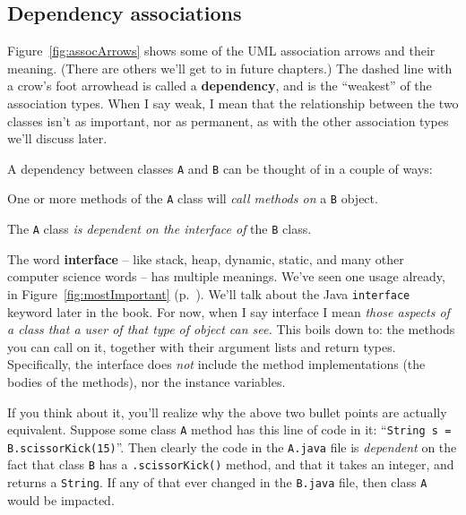 \subsection{Dependency associations}

Figure~\ref{fig:assocArrows} shows some of the UML association arrows and
their meaning. (There are others we'll get to in future chapters.) The dashed
line with a crow's foot arrowhead is called a \textbf{dependency}, and is the
``weakest'' of the association types. When I say weak, I mean that the
relationship between the two classes isn't as important, nor as permanent, as
with the other association types we'll discuss later.

A dependency between classes \texttt{A} and \texttt{B} can be thought of in a
couple of ways:

\begin{compactitem}
\item One or more methods of the \texttt{A} class will \textit{call methods
on} a \texttt{B} object.
\item The \texttt{A} class \textit{is dependent on the interface of} the
\texttt{B} class.
\end{compactitem}


The word \textbf{interface} -- like stack, heap, dynamic, static, and many
other computer science words -- has multiple meanings. We've seen one usage
already, in Figure~\ref{fig:mostImportant} (p.~\pageref{fig:mostImportant}).
We'll talk about the Java \texttt{interface} keyword later in the book. For
now, when I say interface I mean \textit{those aspects of a class that a user
of that type of object can see.} This boils down to: the methods you can call
on it, together with their argument lists and return types. Specifically, the
interface does \textit{not} include the method implementations (the bodies of
the methods), nor the instance variables.

If you think about it, you'll realize why the above two bullet points are
actually equivalent. Suppose some class \texttt{A} method has this line of
code in it: ``\texttt{String s = B.scissorKick(15)}''. Then clearly the code in
the \texttt{A.java} file is \textit{dependent} on the fact that class
\texttt{B} has a \texttt{.scissorKick()} method, and that it takes an integer,
and returns a \texttt{String}. If any of that ever changed in the
\texttt{B.java} file, then class \texttt{A} would be impacted.

